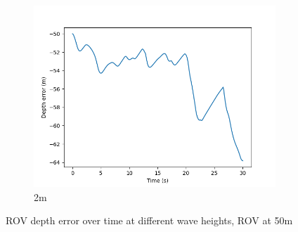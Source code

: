 \documentclass[class=article, crop=false]{standalone}
\begin{document}
\begin{figure}
\begin{subfigure}[b]{0.48\textwidth}
        \includegraphics{scenario1/rov-50m/2.0m/rov_depth_error_controlled}
        \caption{2m}
        \label{}
    \end{subfigure}

    \caption{ROV depth error over time at different wave heights, ROV at 50m}
\end{figure}
\end{document}
